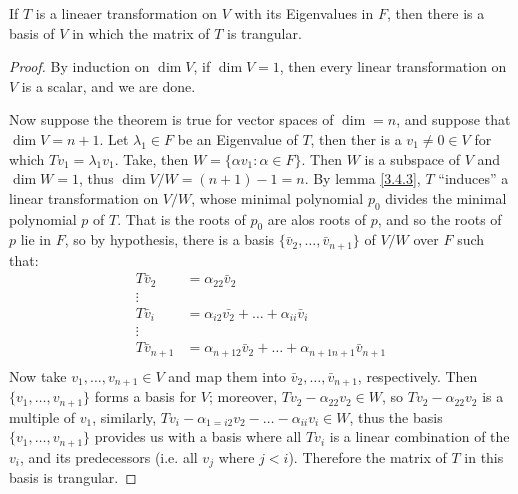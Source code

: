 \begin{theorem}\label{3.4.4}
    If $T$ is a lineaer transformation on  $V$ with its Eigenvalues in  $F$,
    then there is a basis of $V$ in which the matrix of $T$ is trangular.
\end{theorem}
\begin{proof}
    By induction on $\dim{V}$, if $\dim{V}=1$, then every linear transformation
    on $V$ is a scalar, and we are done.

    Now  suppose the theorem is true for vector spaces of  $\dim=n$, and
    suppose that  $\dim{V}=n+1$. Let $\lambda_1 \in F$ be an Eigenvalue of $T$,
    then ther is a  $v_1 \neq 0 \in V$ for which $Tv_1=\lambda_1v_1$. Take,
    then $W=\{\alpha v_1: \alpha \in F\}$. Then $W$ is a subspace of  $V$ and
    $\dim{W}=1$, thus $\dim{V/W}=(n+1)-1=n$. By lemma \ref{3.4.3}, $T$
    ``induces'' a linear transformation on $V/W$, whose minimal polynomial
    $p_0$ divides the minimal polynomial $p$ of  $T$. That is the roots of
    $p_0$ are alos roots of $p$, and so the roots of  $p$ lie in  $F$, so by
    hypothesis, there is a basis $\{\bar{v}_2, \dots, \bar{v}_{n+1}\}$ of $V/W$
    over  $F$ such that:
        \begin{equation*}
            \begin{align*}
                T\bar{v}_2  &=  \alpha_{22}\bar{v}_2    \\
                            \vdots                  \\
                T\bar{v}_i  &=  \alpha_{i2}\bar{v_2}+\dots+\alpha_{ii}\bar{v}_i \\
                            \vdots              \\
                T\bar{v}_{n+1}  &=  \alpha_{n+12}\bar{v}_2+\dots+\alpha_{n+1n+1}\bar{v}_{n+1}   \\
            \end{align*}
        \end{equation*}
    Now take $v_1, \dots, v_{n+1} \in V$ and map them into $\bar{v}_2, \dots,
    \bar{v}_{n+1}$, respectively. Then $\{v_1, \dots, v_{n+1}\}$ forms a basis
    for $V$; moreover,  $Tv_2-\alpha_{22}v_2 \in W$, so $Tv_2-\alpha_{22}v_2$
    is a multiple of $v_1$, similarly,
    $Tv_i-\alpha_{1=i2}v_2-\dots-\alpha_{ii}v_i \in W$, thus the basis $\{v_1, \dots,
    v_{n+1}\}$ provides us with a basis where all $Tv_i$ is a linear
    combination of the  $v_i$, and its predecessors  (i.e. all $v_j$ where
    $j<i$). Therefore the matrix of $T$ in this basis is trangular.
\end{proof}

